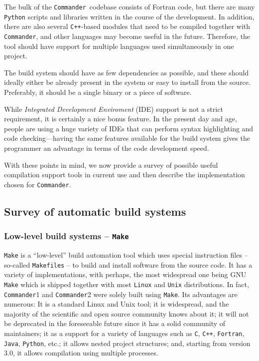 \documentclass[twocolumn]{aa}
\def\commander{\texttt{Commander}}
\begin{document}
 The bulk of the \commander\ codebase consists of Fortran code, but there are many \texttt{Python} scripts and libraries written in the course of the development. In addition, there are also several \texttt{C++}-based modules that need to be compiled together with \commander, and other languages may become useful in the future. Therefore, the tool should have support for multiple languages used simultaneously in one project.

 The build system should have as few dependencies as possible, and these should ideally either be already present in the system or easy to install from the source. Preferably, it should be a single binary or a piece of software.

 While \textit{Integrated Development Enviroment} (IDE) support is not a strict requirement, it is certainly a nice bonus feature. In the present day and age, people are using a huge variety of IDEs that can perform syntax highlighting and code checking—having the same features available for the build system gives the programmer an advantage in terms of the code development speed.

With these points in mind, we now provide a survey of possible useful compilation support tools in current use and then describe the implementation chosen for \commander.

\subsection{Survey of automatic build systems}
\label{sec:build_systems_overview}

\subsubsection{Low-level build systems -- \texttt{Make}}
\texttt{Make} is a ``low-level'' build automation tool which uses special instruction files -- so-called \texttt{Makefiles} -- to build and install software from the source code. It has a variety of implementations, with perhaps, the most widespread one being GNU \texttt{Make} which is shipped together with most \texttt{Linux} and \texttt{Unix} distributions. In fact, \commander1 and \commander2 were solely built using \texttt{Make}. Its advantages are numerous: It is a standard Linux and Unix tool; it is widespread, and the majority of the scientific and open source community knows about it; it will not be deprecated in the foreseeable future since it has a solid community of maintainers; it as a support for a variety of languages such as \texttt{C}, \texttt{C++}, \texttt{Fortran}, \texttt{Java}, \texttt{Python}, etc.; it allows nested project structures; and, starting from version 3.0, it allows compilation using multiple processes.
\end{document}
